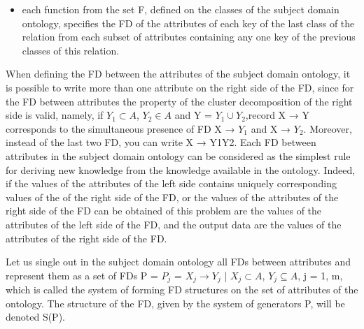 \documentclass[10pt]{article}
\begin{document}
\begin{multicols}{2}
\begin{itemize}[left=10pt,labelsep=0pt,itemsep=-6pt,topsep=0pt]
\item  each function from the set F, defined on the classes
of the subject domain ontology, specifies the FD of
the attributes of each key of the last class of the
relation from each subset of attributes containing
any one key of the previous classes of this relation.
\end{itemize} 
When defining the FD between the attributes of the
subject domain ontology, it is possible to write more
than one attribute on the right side of the FD, since
for the FD between attributes the property of the cluster
decomposition of the right side is valid, namely, if
$Y_1 \subset A$, $Y_2 \in A$ and Y = $Y_1 \cup Y_2$,record
X → Y corresponds to the simultaneous presence of
FD X → $Y_1$ and X → $Y_2$. Moreover, instead of
the last two FD, you can write X → Y1Y2. Each FD
between attributes in the subject domain ontology can
be considered as the simplest rule for deriving new
knowledge from the knowledge available in the ontology.
Indeed, if the values of the attributes of the left side contains uniquely corresponding values of the 
of the right side of the FD, or the values of the attributes
of the right side of the FD can be obtained of this problem are the values of the attributes of the left
side of the FD, and the output data are the values of the
attributes of the right side of the FD.

Let us single out in the subject domain ontology
all FDs between attributes and represent them as a set
of FDs P = {$P_j$ = $X_j \to Y_j$ | $X_j \subset A$, $Y_j \subseteq \textbf{}A$, j = 1, m}, which is called the system of forming FD
structures on the set of attributes of the ontology. The
structure of the FD, given by the system of generators
P, will be denoted S(P). 


\end{multicols}
\end{document}
